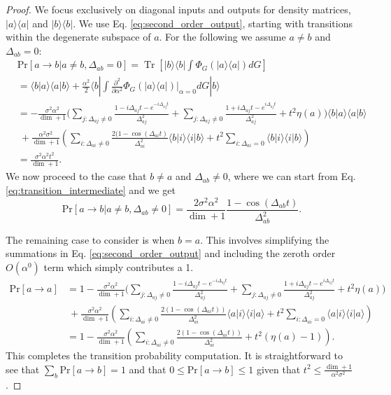 \documentclass{article}
\newcommand{\ket}[1]{|#1\rangle}
\newcommand{\bra}[1]{\langle #1|}
\newcommand{\braket}[2]{\langle #1|#2\rangle}
\newcommand{\ketbra}[2]{| #1\rangle\! \langle #2|}
\newcommand{\parens}[1]{\left( #1 \right)}
\newcommand{\brackets}[1]{\left[ #1 \right]}
\newcommand{\prob}[1]{\text{Pr}\left[ #1 \right]}
\newcommand{\bigo}[1]{O\left( #1 \right)}
\DeclareMathOperator{\Tr}{Tr}
\newcommand{\trace}[1]{\Tr \brackets{ #1 }}
\begin{document}
\begin{proof}
    We focus exclusively on diagonal inputs and outputs for density matrices, $\ketbra{a}{a}$ and $\ketbra{b}{b}$. We use Eq. \eqref{eq:second_order_output}, starting with transitions within the degenerate subspace of $a$. For the following we assume $a \neq b$ and $\Delta_{ab} = 0$: 
    \begin{align}
        &\prob{a \to b | a \neq b, \Delta_{ab} = 0} = \trace{\ketbra{b}{b} \int \Phi_G(\ketbra{a}{a}) dG} \\
        &= \braket{b}{a} \braket{a}{b} + \frac{\alpha^2}{2} \bra{b} \int \frac{\partial^2}{\partial \alpha^2} \Phi_G(\ketbra{a}{a})\bigg|_{\alpha = 0} dG \ket{b} \\
        &= -\frac{\sigma^2 \alpha^2}{\dim + 1} \bigg(\sum_{j: \Delta_{aj} \neq 0} \frac{1 - i \Delta_{aj}t - e^{-i \Delta_{aj} t}}{\Delta_{aj}^2} + \sum_{j: \Delta_{aj} \neq 0} \frac{1 + i \Delta_{aj} t - e^{i \Delta_{aj} t}}{\Delta_{aj}^2} + t^2 \eta(a) \bigg) \braket{b}{a} \braket{a}{b} \nonumber \\
        &~+ \frac{\alpha^2 \sigma^2}{\dim + 1} \parens{\sum_{i: \Delta_{ai} \neq 0} \frac{2(1- \cos(\Delta_{ai} t)}{\Delta_{ai}^2} \braket{b}{i}\braket{i}{b} + t^2 \sum_{i: \Delta_{ai} = 0 } \braket{b}{i} \braket{i}{b}} \label{eq:transition_intermediate} \\
        &= \frac{\sigma^2 \alpha^2 t^2}{\dim + 1}. 
    \end{align}
    We now proceed to the case that $b \neq a$ and $\Delta_{ab} \neq 0$, where we can start from Eq. \eqref{eq:transition_intermediate} and we get
    \begin{equation}
        \prob{a \to b | a \neq b, \Delta_{ab} \neq 0} = \frac{2 \sigma^2 \alpha^2 }{\dim + 1} \frac{1 - \cos (\Delta_{ab} t)}{\Delta_{ab}^2}.
    \end{equation}

    The remaining case to consider is when $b = a$. This involves simplifying the summations in Eq. \eqref{eq:second_order_output} and including the zeroth order $\bigo{\alpha^0}$ term which simply contributes a 1. 
    \begin{align}
        \prob{a \to a} &= 1 -\frac{\sigma^2 \alpha^2 }{\dim + 1} \bigg(\sum_{j: \Delta_{aj} \neq 0} \frac{1 - i \Delta_{aj}t - e^{-i \Delta_{aj} t}}{\Delta_{aj}^2} + \sum_{j: \Delta_{aj} \neq 0} \frac{1 + i \Delta_{aj} t - e^{i \Delta_{aj} t}}{\Delta_{aj}^2} + t^2 \eta(a) \bigg) \nonumber \\
    &~ +\frac{\sigma^2 \alpha^2 }{\dim+1} \parens{ \sum_{i: \Delta_{ai} \neq 0 } \frac{2(1- \cos (\Delta_{ai}t))}{\Delta_{ai}^2} \braket{a}{i} \braket{i}{a} + t^2  \sum_{i : \Delta_{ai} = 0} \braket{a}{i} \braket{i}{a}} \\
    &= 1 - \frac{\sigma^2 \alpha^2}{\dim + 1} \parens{\sum_{i: \Delta_{ai} \neq 0} \frac{2(1 - \cos(\Delta_{ai}t))}{\Delta_{ai}^2} + t^2 (\eta(a) - 1)}.
    \end{align}
    This completes the transition probability computation. It is straightforward to see that $\sum_{b} \prob{a \to b} = 1$ and that $0 \leq \prob{a \to b} \leq 1$ given that $t^2 \leq \frac{\dim + 1}{\alpha^2 \sigma^2}$.
\end{proof}
\end{document}
